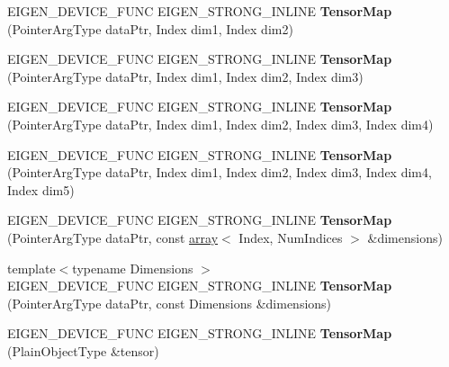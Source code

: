 \begin{DoxyCompactItemize}
E\+I\+G\+E\+N\+\_\+\+D\+E\+V\+I\+C\+E\+\_\+\+F\+U\+NC E\+I\+G\+E\+N\+\_\+\+S\+T\+R\+O\+N\+G\+\_\+\+I\+N\+L\+I\+NE {\bfseries Tensor\+Map} (Pointer\+Arg\+Type data\+Ptr, Index dim1, Index dim2)
\item 
\mbox{\label{class_eigen_1_1_tensor_map_a0473e1dd49ac72e9a59d718309ece71f}} 
E\+I\+G\+E\+N\+\_\+\+D\+E\+V\+I\+C\+E\+\_\+\+F\+U\+NC E\+I\+G\+E\+N\+\_\+\+S\+T\+R\+O\+N\+G\+\_\+\+I\+N\+L\+I\+NE {\bfseries Tensor\+Map} (Pointer\+Arg\+Type data\+Ptr, Index dim1, Index dim2, Index dim3)
\item 
\mbox{\label{class_eigen_1_1_tensor_map_a3a0533faf20086dafcde3640fd6b1582}} 
E\+I\+G\+E\+N\+\_\+\+D\+E\+V\+I\+C\+E\+\_\+\+F\+U\+NC E\+I\+G\+E\+N\+\_\+\+S\+T\+R\+O\+N\+G\+\_\+\+I\+N\+L\+I\+NE {\bfseries Tensor\+Map} (Pointer\+Arg\+Type data\+Ptr, Index dim1, Index dim2, Index dim3, Index dim4)
\item 
\mbox{\label{class_eigen_1_1_tensor_map_a84f22ff9a1b3dc5ec4230c7cb7c34f5c}} 
E\+I\+G\+E\+N\+\_\+\+D\+E\+V\+I\+C\+E\+\_\+\+F\+U\+NC E\+I\+G\+E\+N\+\_\+\+S\+T\+R\+O\+N\+G\+\_\+\+I\+N\+L\+I\+NE {\bfseries Tensor\+Map} (Pointer\+Arg\+Type data\+Ptr, Index dim1, Index dim2, Index dim3, Index dim4, Index dim5)
\item 
\mbox{\label{class_eigen_1_1_tensor_map_a1713f5e0a4b10f0b1ecf2d17c9dca043}} 
E\+I\+G\+E\+N\+\_\+\+D\+E\+V\+I\+C\+E\+\_\+\+F\+U\+NC E\+I\+G\+E\+N\+\_\+\+S\+T\+R\+O\+N\+G\+\_\+\+I\+N\+L\+I\+NE {\bfseries Tensor\+Map} (Pointer\+Arg\+Type data\+Ptr, const \hyperlink{class_eigen_1_1array}{array}$<$ Index, Num\+Indices $>$ \&dimensions)
\item 
\mbox{\label{class_eigen_1_1_tensor_map_a4feacd7bdab7d27868b7ce2a6cc9e442}} 
{\footnotesize template$<$typename Dimensions $>$ }\\E\+I\+G\+E\+N\+\_\+\+D\+E\+V\+I\+C\+E\+\_\+\+F\+U\+NC E\+I\+G\+E\+N\+\_\+\+S\+T\+R\+O\+N\+G\+\_\+\+I\+N\+L\+I\+NE {\bfseries Tensor\+Map} (Pointer\+Arg\+Type data\+Ptr, const Dimensions \&dimensions)
\item 
\mbox{\label{class_eigen_1_1_tensor_map_a3128da48ac78f02a62d274423e70eb17}} 
E\+I\+G\+E\+N\+\_\+\+D\+E\+V\+I\+C\+E\+\_\+\+F\+U\+NC E\+I\+G\+E\+N\+\_\+\+S\+T\+R\+O\+N\+G\+\_\+\+I\+N\+L\+I\+NE {\bfseries Tensor\+Map} (Plain\+Object\+Type \&tensor)

\end{DoxyCompactItemize}
